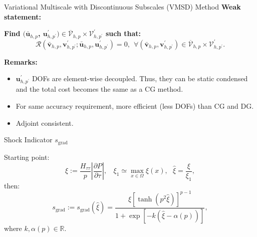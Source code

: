 \documentclass{beamer}
\newcounter{sectionframecount}
\begin{document}
\begin{frame}[t]{Variational Multiscale with Discontinuous Subscales (VMSD) Method}
  \textbf{Weak statement:}

  \vspace{10pt}
  \textbf{Find $(\bar{\boldsymbol{u}}_{h,p}$, $\boldsymbol{u}^\prime_{h,p^\prime}) \in \overline{\mathcal{V}}_{h,p} \times \mathcal{V}^\prime_{h,p^\prime}$ such that:}
  \begin{equation}
    \mathcal{R}(\bar{\boldsymbol{v}}_{h,p},\boldsymbol{v}^\prime_{h,p^\prime};\bar{\boldsymbol{u}}_{h,p},\boldsymbol{u}^\prime_{h,p^\prime}) = 0,~~\forall (\bar{\boldsymbol{v}}_{h,p},\boldsymbol{v}^\prime_{h,p^\prime}) \in \overline{\mathcal{V}}_{h,p} \times \mathcal{V}^\prime_{h,p^\prime}.
    \label{e:multiscale_weak_statement}
  \end{equation}

  \vspace{10pt}
  \textbf{Remarks:}
  \begin{itemize}
    \item $\boldsymbol{u}^\prime_{h,p^\prime}$ DOFs are element-wise decoupled. Thus, they can be static condensed and the total cost becomes the same as a CG method.
    \item For same accuracy requirement, more efficient (less DOFs) than CG and DG.
    \item Adjoint consistent.
  \end{itemize}
\end{frame}


\begin{frame}[t]{Shock Indicator $s_{\text{grad}}$}

  Starting point:
  \begin{equation}
    \xi := \dfrac{H_{\tau\tau}}{p} \left|\dfrac{\partial P}{\partial \tau}\right|,~~~~ \xi_1 \simeq \max_{x\in\Omega} \xi(x),~~~\hat{\xi} = \dfrac{\xi}{\xi_1},
  \end{equation}
  then:
  \begin{equation}
    s_\text{grad} := s_\text{grad}(\hat{\xi}) = \dfrac{\hat{\xi} [\tanh(p^2\hat{\xi})]^{p-1}}{1+\exp\left[-k \left(\hat{\xi} - \alpha(p)\right)\right]},
    \label{e:s_grad}
  \end{equation}
  where $k,\alpha(p) \in \mathbb{R}$.
\end{frame}
\end{document}
